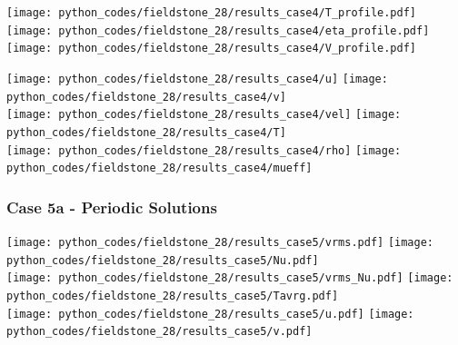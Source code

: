 \begin{center}
\texttt{[image: python\_codes/fieldstone\_28/results\_case4/T\_profile.pdf]}
\texttt{[image: python\_codes/fieldstone\_28/results\_case4/eta\_profile.pdf]}
\texttt{[image: python\_codes/fieldstone\_28/results\_case4/V\_profile.pdf]}
\end{center}

\newpage
\begin{center}
\texttt{[image: python\_codes/fieldstone\_28/results\_case4/u]}
\texttt{[image: python\_codes/fieldstone\_28/results\_case4/v]}\\
\texttt{[image: python\_codes/fieldstone\_28/results\_case4/vel]}
\texttt{[image: python\_codes/fieldstone\_28/results\_case4/T]}\\
\texttt{[image: python\_codes/fieldstone\_28/results\_case4/rho]}
\texttt{[image: python\_codes/fieldstone\_28/results\_case4/mueff]}
\end{center}

\newpage %
\subsubsection*{Case 5a - Periodic Solutions}

\begin{center}
\texttt{[image: python\_codes/fieldstone\_28/results\_case5/vrms.pdf]}
\texttt{[image: python\_codes/fieldstone\_28/results\_case5/Nu.pdf]}\\
\texttt{[image: python\_codes/fieldstone\_28/results\_case5/vrms\_Nu.pdf]}
\texttt{[image: python\_codes/fieldstone\_28/results\_case5/Tavrg.pdf]}\\
\texttt{[image: python\_codes/fieldstone\_28/results\_case5/u.pdf]}
\texttt{[image: python\_codes/fieldstone\_28/results\_case5/v.pdf]}
\end{center}


